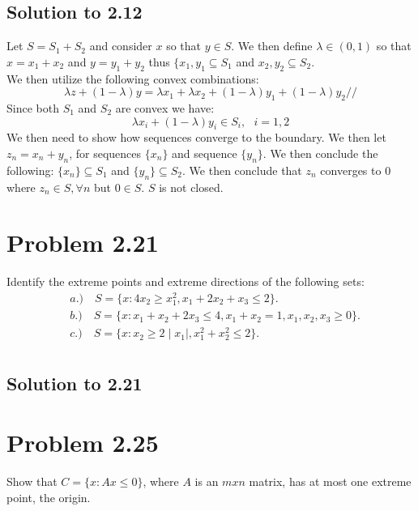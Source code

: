 \documentclass[12pt]{article}
\begin{document}
\subsection{Solution to 2.12}
Let $S = S_1 + S_2$ and consider $x$ so that $y \in S$. We then define $\lambda \in (0,1)$ so that $x = x_1 + x_2$ and $y = y_1 + y_2$ thus $\{ x_1, y_1 \subseteq S_1$ and $x_2 , y_2 \subseteq S_2$.\\
We then utilize the following convex combinations:
    \begin{equation*}
        \lambda z + (1-\lambda)y = \lambda x_1 + \lambda x_2 + (1-\lambda)y_1 + (1-\lambda)y_2//
    \end{equation*}
Since both $S_1$ and $S_2$ are convex we have: 
    \begin{equation*}
        \lambda x_i + (1 - \lambda)y_i \in S_i, \text{ } i=1,2
    \end{equation*}
We then need to show how sequences converge to the boundary. 
We then let $z_n = x_n + y_n$, for sequences $\{x_n\}$ and sequence $\{y_n\}$. We then conclude the following: $\{x_n\} \subseteq S_1$ and $\{y_n\} \subseteq S_2$. We then conclude that $z_n$ converges to 0 where $z_n \in S, \forall n$ but $0 \in S$. $S$ is not closed. 


\section{Problem 2.21}
Identify the extreme points and extreme directions of the following sets:\\
    \begin{align*}
        &a.) \quad S = \{ x: 4x_2 \geq x_1^2, x_1 + 2x_2 + x_3 \leq 2\}.\\
        &b.) \quad S = \{ x: x_1 + x_2 + 2x_3 \leq 4, x_1 + x_2 = 1, x_1, x_2, x_3 \geq 0 \}.\\
        &c.) \quad S = \{ x: x_2 \ge 2\mid x_1 \mid , x_1^2 + x_2^2 \leq 2 \}.\\
    \end{align*} 

\subsection{Solution to 2.21}

\section{Problem 2.25}
Show that $C=\{x: Ax \leq 0\}$, where $A$ is an $m x n$ matrix, has at most one extreme point, the origin.\\
\end{document}

